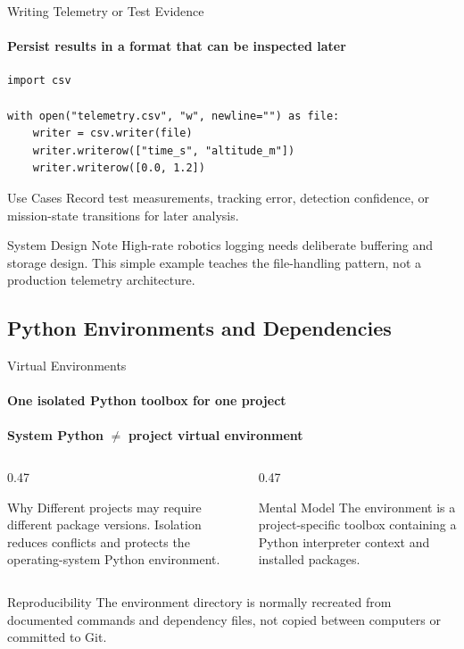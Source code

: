 \begin{frame}[fragile]{Writing Telemetry or Test Evidence}
\framesubtitle{Persist results in a format that can be inspected later}
\begin{verbatim}
import csv

with open("telemetry.csv", "w", newline="") as file:
    writer = csv.writer(file)
    writer.writerow(["time_s", "altitude_m"])
    writer.writerow([0.0, 1.2])
\end{verbatim}
\begin{exampleblock}{Use Cases}
Record test measurements, tracking error, detection confidence, or mission-state transitions for later analysis.
\end{exampleblock}
\begin{alertblock}{System Design Note}
High-rate robotics logging needs deliberate buffering and storage design. This simple example teaches the file-handling pattern, not a production telemetry architecture.
\end{alertblock}
\end{frame}

\subsection{Python Environments and Dependencies}

\begin{frame}{Virtual Environments}
\framesubtitle{One isolated Python toolbox for one project}
\begin{center}
\textbf{System Python} \(\neq\) \textbf{project virtual environment}
\end{center}
\begin{columns}[T,onlytextwidth]
\begin{column}{0.47\textwidth}
\begin{block}{Why}
Different projects may require different package versions. Isolation reduces conflicts and protects the operating-system Python environment.
\end{block}
\end{column}
\hfill
\begin{column}{0.47\textwidth}
\begin{block}{Mental Model}
The environment is a project-specific toolbox containing a Python interpreter context and installed packages.
\end{block}
\end{column}
\end{columns}
\begin{exampleblock}{Reproducibility}
The environment directory is normally recreated from documented commands and dependency files, not copied between computers or committed to Git.
\end{exampleblock}
\end{frame}

